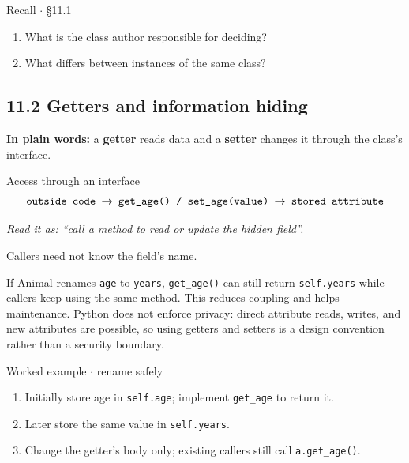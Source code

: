 \documentclass[11pt]{article}
\begin{document}
\begin{keepsection}
\begin{recallbox}{Recall \ensuremath{\cdot} §11.1}
\begin{enumerate}
\item What is the class author responsible for deciding?
\item What differs between instances of the same class?
\end{enumerate}

\end{recallbox}
\end{keepsection}

\begin{keepsection}
\section{11.2 Getters and information hiding}

\begin{plainbox}\textbf{In plain words:} a \textbf{getter} reads data and a \textbf{setter} changes it through the class’s interface.\end{plainbox}

\begin{equationcard}{Access through an interface}
\[ \begin{gathered} \texttt{outside code \ensuremath{\to} get\_age() / set\_age(value) \ensuremath{\to} stored attribute} \end{gathered} \]
{\small \emph{Read it as: “call a method to read or update the hidden field”.}\par Callers need not know the field’s name.}
\end{equationcard}

If Animal renames \texttt{age} to \texttt{years}, \texttt{get\_age()} can still return \texttt{self.years} while callers keep using the same method. This reduces coupling and helps maintenance. Python does not enforce privacy: direct attribute reads, writes, and new attributes are possible, so using getters and setters is a design convention rather than a security boundary.

\begin{workedbox}{Worked example \ensuremath{\cdot} rename safely}
\begin{enumerate}
\item Initially store age in \texttt{self.age}; implement \texttt{get\_age} to return it.
\item Later store the same value in \texttt{self.years}.
\item Change the getter’s body only; existing callers still call \texttt{a.get\_age()}.
\end{enumerate}
\end{workedbox}


\end{keepsection}
\end{document}
